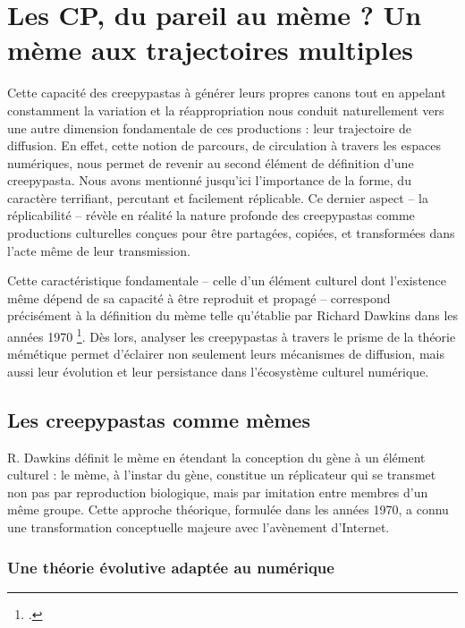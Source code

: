 \documentclass[12pt,a4paper,oneside,titlepage]{book} %
\begin{document}
\chapter[Les CP: du pareil au mème ? ]{Les CP, du pareil au mème ? Un mème aux trajectoires multiples}



Cette capacité des creepypastas à générer leurs propres canons tout en appelant constamment la variation et la réappropriation nous conduit naturellement vers une autre dimension fondamentale de ces productions : leur trajectoire de diffusion. En effet, cette notion de parcours, de circulation à travers les espaces numériques, nous permet de revenir au second élément de définition d'une creepypasta. Nous avons mentionné jusqu'ici l'importance de la forme, du caractère terrifiant, percutant et facilement réplicable. Ce dernier aspect – la réplicabilité – révèle en réalité la nature profonde des creepypastas comme productions culturelles conçues pour être partagées, copiées, et transformées dans l'acte même de leur transmission. 

Cette caractéristique fondamentale – celle d'un élément culturel dont l'existence même dépend de sa capacité à être reproduit et propagé – correspond précisément à la définition du mème telle qu'établie par Richard Dawkins dans les années 1970 \footcite{dawkins_selfish_1989}. Dès lors, analyser les creepypastas à travers le prisme de la théorie mémétique permet d'éclairer non seulement leurs mécanismes de diffusion, mais aussi leur évolution et leur persistance dans l'écosystème culturel numérique.


    \section{Les creepypastas comme mèmes}

R. Dawkins définit le mème en étendant la conception du gène à un élément culturel : le mème, à l'instar du gène, constitue un réplicateur qui se transmet non pas par reproduction biologique, mais par imitation entre membres d'un même groupe. Cette approche théorique, formulée dans les années 1970, a connu une transformation conceptuelle majeure avec l'avènement d'Internet.

\subsection{Une théorie évolutive adaptée au numérique}
\end{document}
